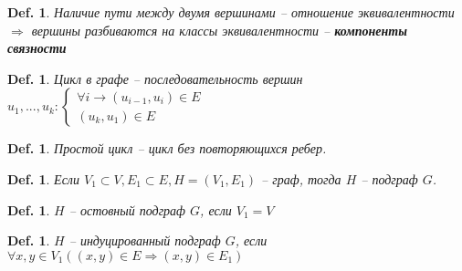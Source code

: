\documentclass[12pt]{article}
\def\SO{\Rightarrow}     %
\theoremstyle{definition} %
\theoremstyle{plain} %
\newtheorem{Def}[Thm]{Def.} %
\theoremstyle{remark} %
\begin{document}
\begin{Def}
    Наличие пути между двумя вершинами -- отношение эквивалентности $\SO$ вершины разбиваются на классы эквивалентности -- \textbf{компоненты связности} 
\end{Def}

\begin{Def}
    Цикл в графе -- последовательность вершин $u_1, ..., u_k : \begin{cases}
        \forall i \to (u_{i - 1}, u_i) \in E \\
        (u_k, u_1) \in E
    \end{cases}$ 
\end{Def}

\begin{Def}
    Простой цикл -- цикл без повторяющихся ребер.
\end{Def}

\begin{Def}
    Если $V_1 \subset V, E_1 \subset E, H = (V_1, E_1)$ -- граф, тогда $H$ -- подграф $G$.
\end{Def}

\begin{Def}
    $H$ -- остовный подграф $G$, если $V_1 = V$
\end{Def}

\begin{Def}
    $H$ -- индуцированный подграф $G$, если $\forall x, y \in V_1 ((x, y) \in E \SO (x, y) \in E_1)$ 
\end{Def}
\end{document}
